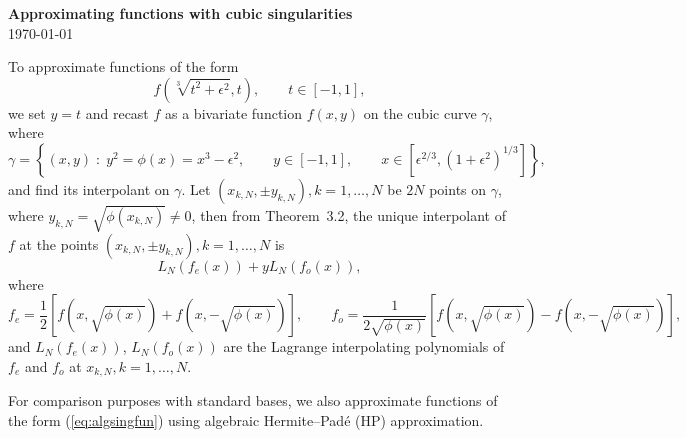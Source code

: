 \documentclass[12pt,a4paper]{article}
\begin{document}
\begin{center}
{\large \textbf{Approximating functions with cubic singularities}}\\
{\footnotesize \today}
\end{center}

\noindent To approximate functions of the form
\begin{equation}
f(\sqrt[3]{t^2 + \epsilon^2},t), \qquad t \in [-1, 1], \label{eq:algsingfun}
\end{equation}
we set $y = t$ and recast $f$ as a bivariate function $f(x,y)$ on the cubic curve $\gamma$, where
\begin{equation}
\gamma = \left\lbrace (x,y) \; : \; y^2 = \phi(x) = x^3 - \epsilon^2,\qquad y\in [-1, 1], \qquad x \in [\epsilon^{2/3}, \left(1 + \epsilon^2\right)^{1/3}] \right\rbrace, \label{eq:gammadef}
\end{equation}
and find its interpolant on $\gamma$. Let $(x_{k,N},\pm y_{k,N}), k = 1, \ldots, N$ be $2N$ points on $\gamma$, where $y_{k,N} = \sqrt{\phi(x_{k,N})} \neq 0$, then from Theorem~3.2, the unique interpolant of $f$ at the points $(x_{k,N},\pm y_{k,N}), k = 1, \ldots, N$ is
\[
L_N(f_e(x)) + yL_N(f_o(x)),
\]  
where 
\[
f_e = \frac{1}{2}\left[ f(x,\sqrt{\phi(x)}) + f(x,-\sqrt{\phi(x)}) \right], \qquad
f_o = \frac{1}{2\sqrt{\phi(x)}}\left[ f(x,\sqrt{\phi(x)}) - f(x,-\sqrt{\phi(x)}) \right],
\]
and $L_N(f_e(x))$, $L_N(f_o(x))$ are the Lagrange interpolating polynomials of $f_e$ and $f_o$ at $x_{k,N}, k = 1, \ldots, N$. 

For comparison purposes with standard bases, we also approximate functions of the form (\ref{eq:algsingfun}) using algebraic Hermite--Pad\'e (HP) approximation. 
\end{document}
